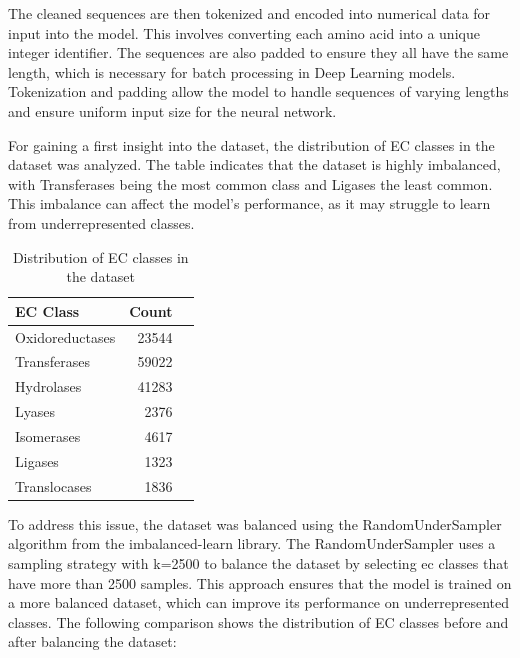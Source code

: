 The cleaned sequences are then tokenized and encoded into numerical data for input into the model. This involves converting each amino acid into a unique integer identifier. The sequences are also padded to ensure they all have the same length, which is necessary for batch processing in Deep Learning models. Tokenization and padding allow the model to handle sequences of varying lengths and ensure uniform input size for the neural network. \autocite{dangRepeatedPaddingData2024}

For gaining a first insight into the dataset, the distribution of EC classes in the dataset was analyzed. The table indicates that the dataset is highly imbalanced, with Transferases being the most common class and Ligases the least common. This imbalance can affect the model's performance, as it may struggle to learn from underrepresented classes.

\begin{table}[hbt]
    \centering
    \begin{tabular}{lrr}
        \toprule
        EC Class & Count \\
        \midrule
        Oxidoreductases & 23544 \\
        Transferases & 59022 \\
        Hydrolases & 41283 \\
        Lyases & 2376 \\
        Isomerases & 4617 \\
        Ligases & 1323 \\
        Translocases & 1836 \\
        \bottomrule
    \end{tabular}
    \caption{Distribution of EC classes in the dataset}
    \label{tab:ec-class-distribution}
\end{table}

To address this issue, the dataset was balanced using the RandomUnderSampler algorithm from the imbalanced-learn library. The RandomUnderSampler uses a sampling strategy with k=2500 to balance the dataset by selecting ec classes that have more than 2500 samples. This approach ensures that the model is trained on a more balanced dataset, which can improve its performance on underrepresented classes. The following comparison shows the distribution of EC classes before and after balancing the dataset:

